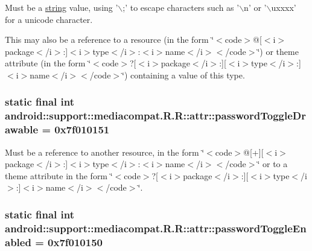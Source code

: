 Must be a \hyperlink{classandroid_1_1support_1_1mediacompat_1_1_r_1_1string}{string} value, using '$\backslash$;' to escape characters such as '$\backslash$n' or '$\backslash$uxxxx' for a unicode character. 

This may also be a reference to a resource (in the form \char`\"{}$<$code$>$@\mbox{[}$<$i$>$package$<$/i$>$:\mbox{]}$<$i$>$type$<$/i$>$:$<$i$>$name$<$/i$>$$<$/code$>$\char`\"{}) or theme attribute (in the form \char`\"{}$<$code$>$?\mbox{[}$<$i$>$package$<$/i$>$:\mbox{]}\mbox{[}$<$i$>$type$<$/i$>$:\mbox{]}$<$i$>$name$<$/i$>$$<$/code$>$\char`\"{}) containing a value of this type. \hypertarget{classandroid_1_1support_1_1mediacompat_1_1_r_1_1attr_0a309ba4bc11bea14e30adbd1a34dfda}{
\subsubsection[{passwordToggleDrawable}]{\setlength{\rightskip}{0pt plus 5cm}static final int android::support::mediacompat.R.R::attr::passwordToggleDrawable = 0x7f010151}}
\label{classandroid_1_1support_1_1mediacompat_1_1_r_1_1attr_0a309ba4bc11bea14e30adbd1a34dfda}


Must be a reference to another resource, in the form \char`\"{}$<$code$>$@\mbox{[}+\mbox{]}\mbox{[}$<$i$>$package$<$/i$>$:\mbox{]}$<$i$>$type$<$/i$>$:$<$i$>$name$<$/i$>$$<$/code$>$\char`\"{} or to a theme attribute in the form \char`\"{}$<$code$>$?\mbox{[}$<$i$>$package$<$/i$>$:\mbox{]}\mbox{[}$<$i$>$type$<$/i$>$:\mbox{]}$<$i$>$name$<$/i$>$$<$/code$>$\char`\"{}. \hypertarget{classandroid_1_1support_1_1mediacompat_1_1_r_1_1attr_d440c2ef8beced26c0f03105aa9e8ebb}{
\subsubsection[{passwordToggleEnabled}]{\setlength{\rightskip}{0pt plus 5cm}static final int android::support::mediacompat.R.R::attr::passwordToggleEnabled = 0x7f010150}}
\label{classandroid_1_1support_1_1mediacompat_1_1_r_1_1attr_d440c2ef8beced26c0f03105aa9e8ebb}


